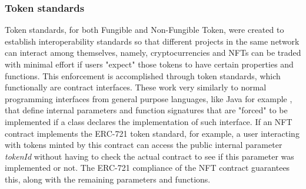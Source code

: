 \documentclass[../main.tex]{subfiles}
\begin{document}
\subsubsection{Token standards}
\label{sec:token_standards}
Token standards, for both Fungible and Non-Fungible Token, were created to establish interoperability standards so that different projects in the same network can interact among themselves, namely, cryptocurrencies and NFTs can be traded with minimal effort if users "expect" those tokens to have certain properties and functions. This enforcement is accomplished through token standards, which functionally are contract interfaces. These work very similarly to normal programming interfaces from general purpose languages, like Java for example \cite{Oracle2024}, that define internal parameters and function signatures that are "forced" to be implemented if a class declares the implementation of such interface. If an NFT contract implements the ERC-721 token standard, for example, a user interacting with tokens minted by this contract can access the public internal parameter \textit{tokenId} without having to check the actual contract to see if this parameter was implemented or not. The ERC-721 compliance of the NFT contract guarantees this, along with the remaining parameters and functions.
\end{document}
